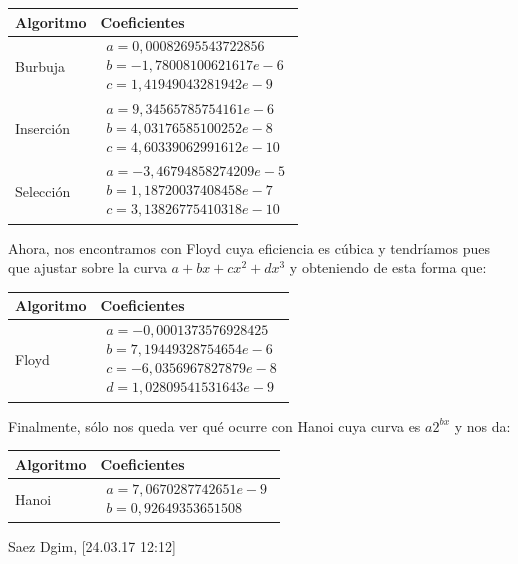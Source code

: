 \documentclass[a4paper, 11pt]{article}
\begin{document}
\begin{center}
\begin{tabular}{ll}
Algoritmo & Coeficientes\\ \hline\noalign{\smallskip}
Burbuja  &  $\begin{array}{lll}
  a = 0,00082695543722856\\
b = -1,78008100621617e-6\\
c = 1,41949043281942e-9
\end{array}$  \\\hline\noalign{\smallskip}
  Inserción  & $\begin{array}{lll}
  a = 9,34565785754161e-6\\
b = 4,03176585100252e-8\\
c = 4,60339062991612e-10
\end{array}$\\\hline\noalign{\smallskip}
  Selección  & $\begin{array}{lll}
  a = -3,46794858274209e-5\\
b = 1,18720037408458e-7\\
c = 3,13826775410318e-10
\end{array}$\\
\end{tabular}
\end{center}

Ahora, nos encontramos con Floyd cuya eficiencia es cúbica y tendríamos pues que ajustar sobre la curva $a+bx+cx^2+dx^3$ y obteniendo de esta forma que:
\begin{center}
\begin{tabular}{ll}
Algoritmo & Coeficientes\\ \hline\noalign{\smallskip}
Floyd  & $\begin{array}{llll}
  a = -0,0001373576928425\\
b = 7,19449328754654e-6\\
c = -6,0356967827879e-8\\
d = 1,02809541531643e-9
\end{array}$\\
\end{tabular}
\end{center}

Finalmente, sólo nos queda ver qué ocurre con Hanoi cuya curva es $a2^{bx}$ y nos da:
\begin{center}
\begin{tabular}{ll}
Algoritmo & Coeficientes\\ \hline\noalign{\smallskip}
Hanoi  & $\begin{array}{ll}
  a = 7,0670287742651e-9\\
b = 0,92649353651508
\end{array}$
\end{tabular}
\end{center}
Saez Dgim, [24.03.17 12:12]
\end{document}
